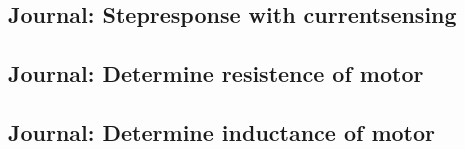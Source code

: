 \documentclass[../../main]{subfiles}
\begin{document}
\subsection{Journal: Stepresponse with currentsensing}%
\label{sub:journal_stepresponse_with_currentsensing}

\subsection{Journal: Determine resistence of motor}%
\label{sub:journal_determine_resistence_of_motor}


\subsection{Journal: Determine inductance of motor}%
\label{sub:journal_determine_inductance_of_motor}

\end{document}
